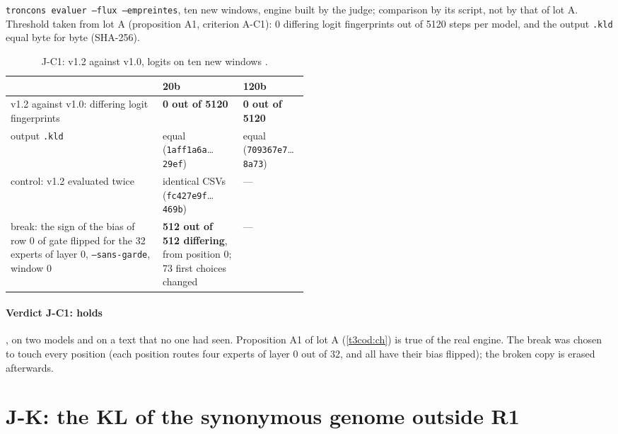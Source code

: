 \texttt{troncons evaluer --flux --empreintes}, ten new windows, engine built by the judge; comparison by its script, not by that of lot A. Threshold taken from lot A (proposition A1, criterion A-C1): 0 differing logit fingerprints out of \num{5120} steps per model, and the output \texttt{.kld} equal byte for byte (SHA-256).

\begin{table}[ht]
\centering\footnotesize
\caption[J-C1: the logits to the bit on the new windows]{J-C1: v1.2 against v1.0, logits on ten new windows \mes.}
\label{t3jug:tab:jc1}
\begin{tabularx}{\linewidth}{@{}>{\raggedright\arraybackslash}X>{\raggedright\arraybackslash}p{0.27\linewidth}>{\raggedright\arraybackslash}p{0.22\linewidth}@{}}
\toprule
& 20b & 120b \\
\midrule
v1.2 against v1.0: differing logit fingerprints & \textbf{0 out of \num{5120}} & \textbf{0 out of \num{5120}} \\
output \texttt{.kld} & equal (\texttt{1aff1a6a}…\texttt{29ef}) & equal (\texttt{709367e7}…\texttt{8a73}) \\
control: v1.2 evaluated twice & identical CSVs (\texttt{fc427e9f}…\texttt{469b}) & --- \\
break: the sign of the bias of row 0 of gate flipped for the 32 experts of layer 0, \texttt{--sans-garde}, window 0 & \textbf{512 out of 512 differing}, from position 0; 73 first choices changed & --- \\
\bottomrule
\end{tabularx}
\end{table}

\paragraph{Verdict J-C1: holds}, on two models and on a text that no one had seen. Proposition A1 of lot A (\cref{t3cod:ch}) is true of the real engine. The break was chosen to touch every position (each position routes four experts of layer 0 out of 32, and all have their bias flipped); the broken copy is erased afterwards.

\section{J-K: the KL of the synonymous genome outside R1}\label{t3jug:sec:kl}

